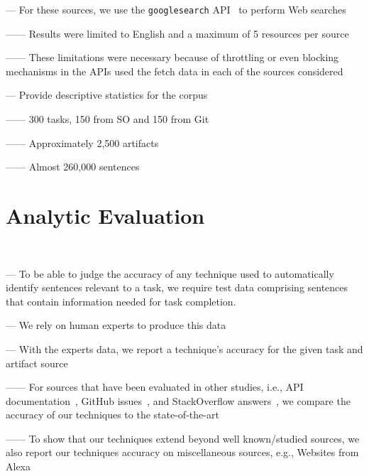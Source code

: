 \vspace{3mm}

--- For these sources, we use the \texttt{googlesearch} API~\cite{googlesearch} to perform Web searches

------ Results were limited to English and a maximum of 5 resources per source 

------ These limitations were necessary because of throttling or even blocking mechanisms in the APIs used the fetch data in each of the sources considered \vspace{3mm}

--- Provide descriptive statistics for the corpus

------ 300 tasks, 150 from SO and 150 from Git

------ Approximately 2,500 artifacts

------ Almost 260,000 sentences

\clearpage


\section{Analytic Evaluation}
\textcolor{white}{force ident} %


--- To be able to judge the accuracy of any technique used to automatically identify sentences relevant to a task,
we require test data comprising sentences that contain information needed for task completion. \vspace{3mm}

--- We rely on human experts to produce this data \vspace{3mm}


--- With the experts data, we report a technique's accuracy for the given task and artifact source

------ For sources that have been evaluated in other studies, i.e., API documentation~\cite{Robillard2015}, GitHub issues~\cite{Lotufo2012}, and StackOverflow answers~\cite{Xu2017}, we compare the accuracy of our techniques 
to the state-of-the-art

------ To show that our techniques extend beyond well known/studied sources, we also report our techniques accuracy on miscellaneous sources, e.g., Websites from Alexa



